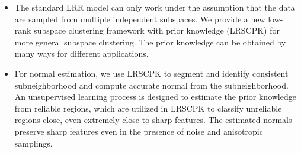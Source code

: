 \begin{itemize}
  \item The standard LRR model can only work under the assumption that the data are sampled from multiple independent subspaces. We provide a new low-rank subspace clustering framework with prior knowledge (LRSCPK) for more general subspace clustering. The prior knowledge can be obtained by many ways for different applications.
  \item For normal estimation, we use LRSCPK to segment and identify consistent subneighborhood and compute accurate normal from the subneighborhood.
      An unsupervised learning process is designed to estimate the prior knowledge from reliable regions, which are utilized in LRSCPK to classify unreliable regions close, even extremely close to sharp features.
       The estimated normals preserve sharp features even in the presence of noise and anisotropic samplings.

\end{itemize}
%
